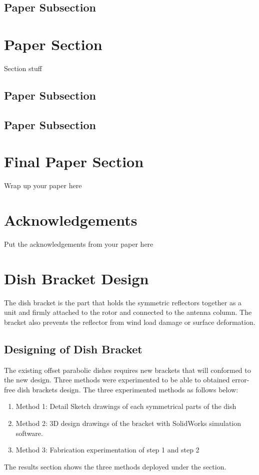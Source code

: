 {\subsection{Paper Subsection}
\section{Paper Section}
Section stuff

\subsection{Paper Subsection}

\subsection{Paper Subsection}
\section{Final Paper Section}
Wrap up your paper here

\section*{Acknowledgements}
Put the acknowledgements from your paper here





\section{Dish Bracket Design}
The dish bracket is the part that holds the symmetric reflectors together as a unit and firmly attached to the rotor and connected to the antenna column. The bracket also prevents the reflector from wind load damage or surface deformation.


\subsection{Designing of Dish Bracket}
The existing offset parabolic dishes requires new brackets that will conformed to the new design.
Three methods were experimented to be able to obtained error-free dish brackets design. The three experimented methods as follows below:
\begin{enumerate}[label=\alph*.]
\item Method 1:
Detail Sketch drawings of each symmetrical parts of the dish  
\item Method 2:
3D design drawings of the bracket  with SolidWorks simulation software.
\item Method 3:
Fabrication experimentation of step 1 and step 2
\end{enumerate}
The results section shows the three methods deployed under the section.









}
